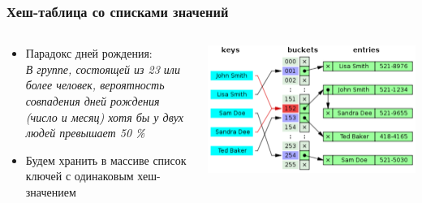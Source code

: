 \documentclass[xetex,mathserif,serif]{beamer}
\begin{document}
	\begin{frame}
		\frametitle{Хеш-таблица со списками значений}
		\begin{columns}
			\begin{column}{0.6\textwidth}
				\begin{itemize}
					\item Парадокс дней рождения: \\
					\textit{В группе, состоящей из 23 или более человек, вероятность совпадения дней рождения (число и месяц) хотя бы у двух людей превышает 50 \%}
					\item Будем хранить в массиве список ключей с одинаковым хеш-значением
				\end{itemize}
			\end{column}
			\begin{column}{0.4\textwidth}
				\begin{center}
					\includegraphics[width=\textwidth]{hashOnLists.png}
				\end{center}
			\end{column}
		\end{columns}
	\end{frame}
\end{document}

